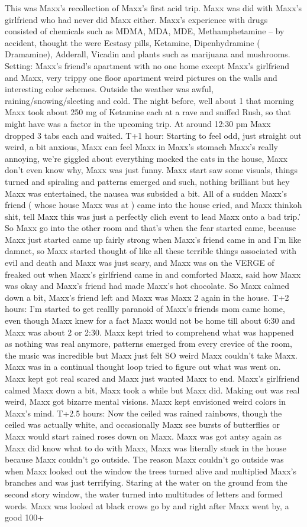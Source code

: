 \documentclass[12pt]{book}
\begin{document}
This was Maxx's recollection of Maxx's first acid trip. Maxx was did with Maxx's girlfriend who had never did Maxx either. Maxx's experience with drugs consisted of chemicals such as MDMA, MDA, MDE, Methamphetamine -- by accident, thought the were Ecstasy pills, Ketamine, Dipenhydramine ( Dramamine), Adderall, Vicadin and plants such as marijuana and mushrooms. Setting: Maxx's friend's apartment with no one home except Maxx's girlfriend and Maxx, very trippy one floor apartment weird pictures on the walls and interesting color schemes. Outside the weather was awful, raining/snowing/sleeting and cold. The night before, well about 1 that morning Maxx took about 250 mg of Ketamine each at a rave and sniffed Rush, so that might have was a factor in the upcoming trip. At around 12:30 pm Maxx dropped 3 tabs each and waited. T+1 hour: Starting to feel odd, just straight out weird, a bit anxious, Maxx can feel Maxx in Maxx's stomach Maxx's really annoying, we're giggled about everything mocked the cats in the house, Maxx don't even know why, Maxx was just funny. Maxx start saw some visuals, things turned and spiraling and patterns emerged and such, nothing brilliant but hey Maxx was entertained, the nausea was subsided a bit. All of a sudden Maxx's friend ( whose house Maxx was at ) came into the house cried, and Maxx thinkoh shit, tell Maxx this was just a perfectly clich event to lead Maxx onto a bad trip.' So Maxx go into the other room and that's when the fear started came, because Maxx just started came up fairly strong when Maxx's friend came in and I'm like damnet, so Maxx started thought of like all these terrible things associated with evil and death and Maxx was just scary, and Maxx was on the VERGE of freaked out when Maxx's girlfriend came in and comforted Maxx, said how Maxx was okay and Maxx's friend had made Maxx's hot chocolate. So Maxx calmed down a bit, Maxx's friend left and Maxx was Maxx 2 again in the house. T+2 hours: I'm started to get reallly paranoid of Maxx's friends mom came home, even though Maxx knew for a fact Maxx would not be home till about 6:30 and Maxx was about 2 or 2:30. Maxx kept tried to comprehend what was happened as nothing was real anymore, patterns emerged from every crevice of the room, the music was incredible but Maxx just felt SO weird Maxx couldn't take Maxx. Maxx was in a continual thought loop tried to figure out what was went on. Maxx kept got real scared and Maxx just wanted Maxx to end. Maxx's girlfriend calmed Maxx down a bit, Maxx took a while but Maxx did. Making out was real weird, Maxx got bizarre mental visions. Maxx kept envisioned weird colors in Maxx's mind. T+2.5 hours: Now the ceiled was rained rainbows, though the ceiled was actually white, and occasionally Maxx see bursts of butterflies or Maxx would start rained roses down on Maxx. Maxx was got antsy again as Maxx did know what to do with Maxx, Maxx was literally stuck in the house because Maxx couldn't go outside. The reason Maxx couldn't go outside was when Maxx looked out the window the trees turned alive and multiplied Maxx's branches and was just terrifying. Staring at the water on the ground from the second story window, the water turned into multitudes of letters and formed words. Maxx was looked at black crows go by and right after Maxx went by, a good 100+ 
\end{document}

